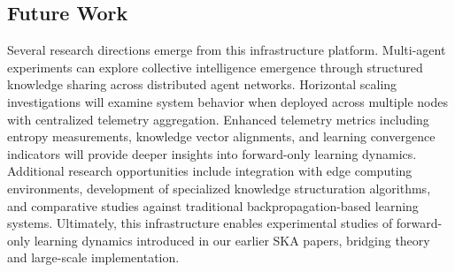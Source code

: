 \documentclass[11pt]{article}
\begin{document}
	\subsection{Future Work}
	Several research directions emerge from this infrastructure platform. Multi-agent experiments can explore collective intelligence emergence through structured knowledge sharing across distributed agent networks. Horizontal scaling investigations will examine system behavior when deployed across multiple nodes with centralized telemetry aggregation. Enhanced telemetry metrics including entropy measurements, knowledge vector alignments, and learning convergence indicators will provide deeper insights into forward-only learning dynamics. Additional research opportunities include integration with edge computing environments, development of specialized knowledge structuration algorithms, and comparative studies against traditional backpropagation-based learning systems. Ultimately, this infrastructure enables experimental studies of forward-only learning dynamics introduced in our earlier SKA papers, bridging theory and large-scale implementation.
	
\end{document}
